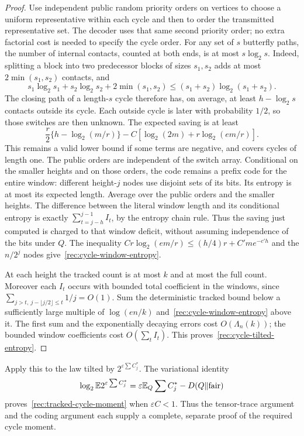 \begin{proof}
Use independent public random priority orders on vertices to choose a
uniform representative within each cycle and then to order the transmitted
representative set.  The decoder uses that same second priority order;
no extra factorial cost is needed to specify the cycle order.  For any set of $s$ butterfly
paths, the number of internal contacts, counted at both ends, is at most
$s\log_2s$.  Indeed, splitting a block into two predecessor blocks of
sizes $s_1,s_2$ adds at most $2\min(s_1,s_2)$ contacts, and
\[
 s_1\log_2s_1+s_2\log_2s_2+2\min(s_1,s_2)
           \le(s_1+s_2)\log_2(s_1+s_2).
\]
The closing path of a length-$s$ cycle therefore has, on average, at
least $h-\log_2s$ contacts outside its cycle.  Each outside cycle is
later with probability $1/2$, so those switches are then unknown.
The expected saving is at least
\[
 \frac{r}{2}\{h-\log_2(m/r)\}
   -C[\log_2(2m)+r\log_2(em/r)].
\]
This remains a valid lower bound if some terms are negative, and covers
cycles of length one.  The public orders are independent of the switch array.  Conditional on
the smaller heights and on those orders, the code remains a prefix code
for the entire window: different height-$j$ nodes use disjoint sets of its
bits.  Its entropy is at most its expected length.  Average over the public
orders and the smaller heights.  The difference between the literal
window length and its conditional entropy is exactly
$\sum_{t=j-h}^{j-1}I_t$, by the entropy chain rule.  Thus the saving just
computed is charged to that window deficit, without assuming independence
of the bits under $Q$.
The inequality
$Cr\log_2(em/r)\le(h/4)r+C'me^{-c'h}$
and the $n/2^j$ nodes give~\eqref{rec:cycle-window-entropy}.

At each height the tracked count is at most $k$ and at most the full
count.  Moreover each $I_t$ occurs with bounded total coefficient in
the windows, since $\sum_{j>t,\ j-\lfloor j/2\rfloor\le t}1/j=O(1)$.
Sum the deterministic tracked bound below a sufficiently large multiple
of $\log(en/k)$ and~\eqref{rec:cycle-window-entropy} above it.
The first sum and the exponentially decaying errors cost
$O(\Lambda_n(k))$; the bounded window coefficients cost
$O(\sum_t I_t)$.  This proves~\eqref{rec:cycle-tilted-entropy}.
\end{proof}
Apply this to the law tilted by $2^{\varepsilon\sum C_j^*}$.
The variational identity
\[
 \log_2\mathbb E2^{\varepsilon\sum C_j^*}
 =\varepsilon\mathbb E_Q\sum C_j^*-D(Q\Vert\mathrm{fair})
\]
proves~\eqref{rec:tracked-cycle-moment} when $\varepsilon C<1$.
Thus the tensor-trace argument and the coding argument each supply a
complete, separate proof of the required cycle moment.

